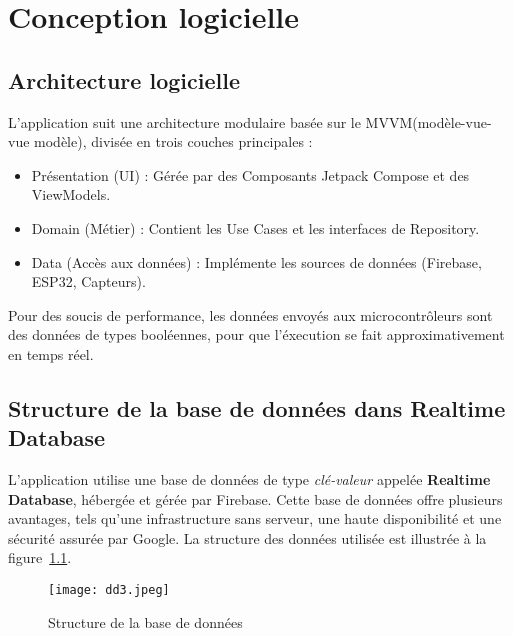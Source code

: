 \pagestyle{fancy}
\fancyhead{} %
\chapter{Conception logicielle}

\section{Architecture logicielle}
L’application suit une architecture modulaire basée sur le MVVM(modèle-vue-vue modèle), divisée en trois couches principales :

\begin{itemize}
\item    Présentation (UI) : Gérée par des Composants Jetpack Compose et des ViewModels.\\

\item    Domain (Métier) : Contient les Use Cases et les interfaces de Repository.\\

\item    Data (Accès aux données) : Implémente les sources de données (Firebase, ESP32, Capteurs).\\
\end{itemize}

Pour des soucis de performance, les données envoyés aux microcontrôleurs sont des données de types booléennes, pour que l'éxecution se fait approximativement en temps réel. 


\section{Structure de la base de données dans Realtime Database}

L'application utilise une base de données de type \textit{clé-valeur} appelée \textbf{Realtime Database}, hébergée et gérée par Firebase. Cette base de données offre plusieurs avantages, tels qu'une infrastructure sans serveur, une haute disponibilité et une sécurité assurée par Google. La structure des données utilisée est illustrée à la figure~\ref{fig:structure_de_la_base_de_donnees}.

\begin{figure}[H]
   \centering
   \texttt{[image: dd3.jpeg]}
   \caption{Structure de la base de données}
   \label{fig:structure_de_la_base_de_donnees}
\end{figure}

